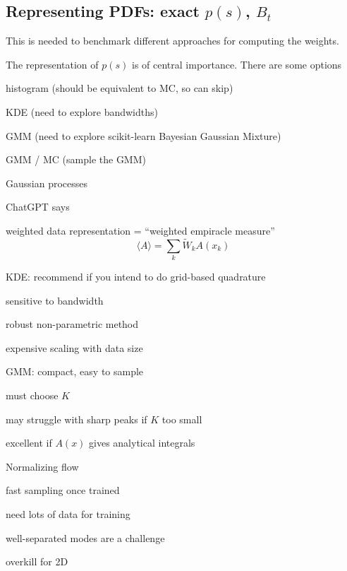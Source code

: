 \subsection{Representing PDFs: exact $p(s)$, $B_t$}
This is needed to benchmark different approaches for computing the weights.

The representation of $p(s)$ is of central importance.  There are some options
\begin{enumeratec}
    \item histogram (should be equivalent to MC, so can skip)
    \item KDE (need to explore bandwidths)
    \item GMM (need to explore scikit-learn Bayesian Gaussian Mixture)
    \item GMM / MC (sample the GMM)
    \item Gaussian processes
\end{enumeratec}

ChatGPT says
\begin{enumeratec}
    \item weighted data representation = ``weighted empiracle measure''
    \[
        \langle A\rangle = \sum_k \tilde{W}_k A(x_k)
    \]
    \item KDE: recommend if you intend to do grid-based quadrature
    \begin{itemizec}
        \item sensitive to bandwidth
        \item robust non-parametric method
        \item expensive scaling with data size
    \end{itemizec}
    \item GMM: compact, easy to sample
    \begin{itemizec}
        \item must choose $K$
        \item may struggle with sharp peaks if $K$ too small
        \item excellent if $A(x)$ gives analytical integrals
    \end{itemizec}
    \item Normalizing flow
    \begin{itemizec}
        \item fast sampling once trained
        \item need lots of data for training
        \item well-separated modes are a challenge
        \item overkill for 2D
    \end{itemizec}
\end{enumeratec}


